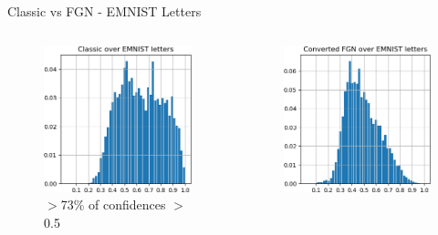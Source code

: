 \documentclass{beamer}
\begin{document}
\begin{frame}{Classic vs FGN - EMNIST Letters}
 \vspace{-3mm}
    \begin{columns}
    \begin{column}{.33\textwidth}
    \begin{figure}
        \includegraphics[width=.85\textwidth]{images/Letters/hist-classic-letters.png}\\
        \centering \tiny{$>$73\% of confidences $>$0.5}
    \end{figure}
    \end{column}
    \begin{column}{.33\textwidth}
    \begin{figure}
        \includegraphics[width=.85\textwidth]{images/Letters/hist-converted-letters.png}\\

\end{figure}
\end{column}
\end{columns}
\end{frame}
\end{document}
